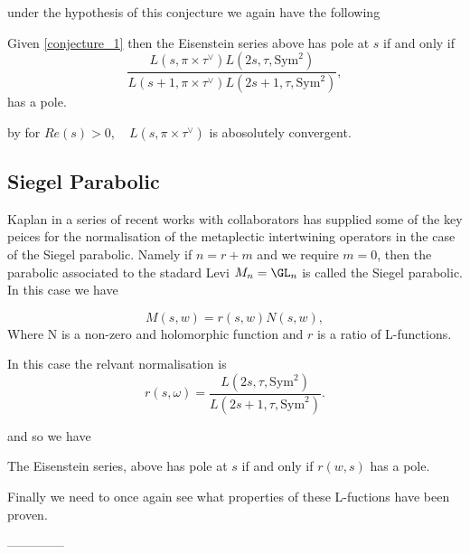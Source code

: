      under the hypothesis of this conjecture we again have the following
     \begin{Lemma}
        Given \ref{conjecture_1} then the Eisenstein series above has pole at \(s\) if and only if 
        \[\frac{L(s, \pi\times \tau^{\vee}) L(2s, \tau, \mathrm{Sym}^2)}{L(s+1, \pi\times \tau^\vee)L(2s+1, \tau, \mathrm{Sym}^2)},\]
        has a pole.
     \end{Lemma}
     by \cite[Thm. 35]{kaplanDoublingConstructionsComplete2021a} for \(Re(s)>0, \quad L(s, \pi\times \tau^{\vee})\) is abosolutely convergent. 


    \subsection{Siegel Parabolic}


    Kaplan in a series of recent works with collaborators \cite{kaplanDoublingConstructionsComplete2021a}\cite{kaplanDoublingConstructionsTensor2020}\cite{caiDoublingConstructionsGlobal2024} has supplied some of the key peices for the normalisation of the metaplectic intertwining operators in the case of the Siegel parabolic. Namely if \(n = r+ m\) and we require \(m=0\), then the parabolic associated to the stadard Levi \(M_n = \GL_n\) is called the Siegel parabolic. In this case we have

    \begin{Theorem}
    \[M(s, w) = r(s,w)N(s,w),\]
    Where N is a non-zero and holomorphic function and \(r\) is a ratio of L-functions.
    \end{Theorem} 

    In this case the relvant normalisation is \cite[Eq. 1.5]{ginzburgTopFourierCoefficients2021}
    \[r(s,\omega) = \frac{ L(2s, \tau, \mathrm{Sym}^2)}{L(2s+1, \tau, \mathrm{Sym}^2)} .\]

    and so we have
    \begin{Lemma}
        The Eisenstein series,  above has pole at \(s\) if and only if \(r(w,s)\) has a pole.
     \end{Lemma}
     Finally we need to once again see what properties of these L-fuctions have been proven. 

    --------------

     \begin{Theorem}
        
     \end{Theorem}

